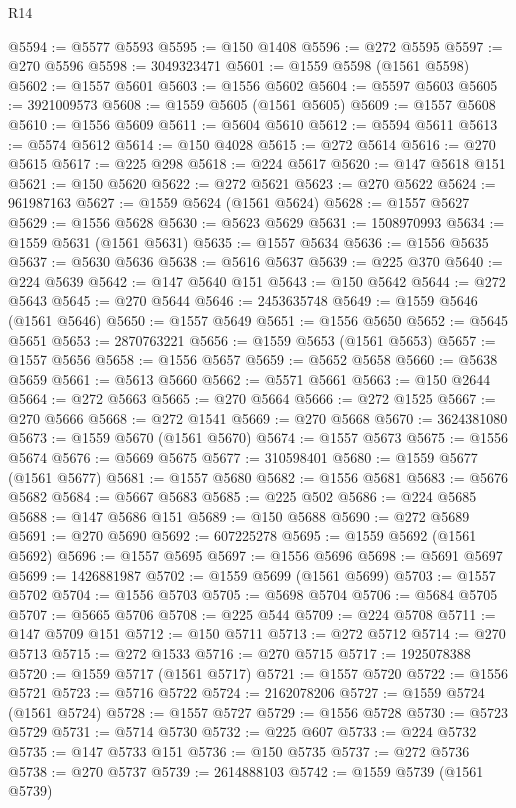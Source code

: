 \begin{lexlean}{R14}
\begin{coremodule}
@5594 := @5577 @5593
@5595 := @150 @1408
@5596 := @272 @5595
@5597 := @270 @5596
@5598 := 3049323471
@5601 := @1559 @5598 (@1561 @5598)
@5602 := @1557 @5601
@5603 := @1556 @5602
@5604 := @5597 @5603
@5605 := 3921009573
@5608 := @1559 @5605 (@1561 @5605)
@5609 := @1557 @5608
@5610 := @1556 @5609
@5611 := @5604 @5610
@5612 := @5594 @5611
@5613 := @5574 @5612
@5614 := @150 @4028
@5615 := @272 @5614
@5616 := @270 @5615
@5617 := @225 @298
@5618 := @224 @5617
@5620 := @147 @5618 @151
@5621 := @150 @5620
@5622 := @272 @5621
@5623 := @270 @5622
@5624 := 961987163
@5627 := @1559 @5624 (@1561 @5624)
@5628 := @1557 @5627
@5629 := @1556 @5628
@5630 := @5623 @5629
@5631 := 1508970993
@5634 := @1559 @5631 (@1561 @5631)
@5635 := @1557 @5634
@5636 := @1556 @5635
@5637 := @5630 @5636
@5638 := @5616 @5637
@5639 := @225 @370
@5640 := @224 @5639
@5642 := @147 @5640 @151
@5643 := @150 @5642
@5644 := @272 @5643
@5645 := @270 @5644
@5646 := 2453635748
@5649 := @1559 @5646 (@1561 @5646)
@5650 := @1557 @5649
@5651 := @1556 @5650
@5652 := @5645 @5651
@5653 := 2870763221
@5656 := @1559 @5653 (@1561 @5653)
@5657 := @1557 @5656
@5658 := @1556 @5657
@5659 := @5652 @5658
@5660 := @5638 @5659
@5661 := @5613 @5660
@5662 := @5571 @5661
@5663 := @150 @2644
@5664 := @272 @5663
@5665 := @270 @5664
@5666 := @272 @1525
@5667 := @270 @5666
@5668 := @272 @1541
@5669 := @270 @5668
@5670 := 3624381080
@5673 := @1559 @5670 (@1561 @5670)
@5674 := @1557 @5673
@5675 := @1556 @5674
@5676 := @5669 @5675
@5677 := 310598401
@5680 := @1559 @5677 (@1561 @5677)
@5681 := @1557 @5680
@5682 := @1556 @5681
@5683 := @5676 @5682
@5684 := @5667 @5683
@5685 := @225 @502
@5686 := @224 @5685
@5688 := @147 @5686 @151
@5689 := @150 @5688
@5690 := @272 @5689
@5691 := @270 @5690
@5692 := 607225278
@5695 := @1559 @5692 (@1561 @5692)
@5696 := @1557 @5695
@5697 := @1556 @5696
@5698 := @5691 @5697
@5699 := 1426881987
@5702 := @1559 @5699 (@1561 @5699)
@5703 := @1557 @5702
@5704 := @1556 @5703
@5705 := @5698 @5704
@5706 := @5684 @5705
@5707 := @5665 @5706
@5708 := @225 @544
@5709 := @224 @5708
@5711 := @147 @5709 @151
@5712 := @150 @5711
@5713 := @272 @5712
@5714 := @270 @5713
@5715 := @272 @1533
@5716 := @270 @5715
@5717 := 1925078388
@5720 := @1559 @5717 (@1561 @5717)
@5721 := @1557 @5720
@5722 := @1556 @5721
@5723 := @5716 @5722
@5724 := 2162078206
@5727 := @1559 @5724 (@1561 @5724)
@5728 := @1557 @5727
@5729 := @1556 @5728
@5730 := @5723 @5729
@5731 := @5714 @5730
@5732 := @225 @607
@5733 := @224 @5732
@5735 := @147 @5733 @151
@5736 := @150 @5735
@5737 := @272 @5736
@5738 := @270 @5737
@5739 := 2614888103
@5742 := @1559 @5739 (@1561 @5739)

\end{coremodule}
\end{lexlean}
